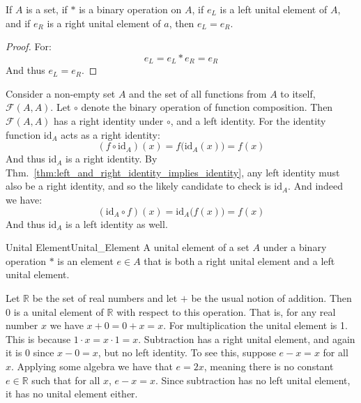     \begin{theorem}
        \label{thm:left_and_right_identity_implies_identity}%
        If $A$ is a set, if $*$ is a binary operation on $A$, if $e_{L}$ is a
        left unital element of $A$, and if $e_{R}$ is a right unital element of
        $a$, then $e_{L}=e_{R}$.
    \end{theorem}
    \begin{proof}
        For:
        \begin{equation}
            e_{L}=e_{L}*e_{R}=e_{R}
        \end{equation}
        And thus $e_{L}=e_{R}$.
    \end{proof}
    \begin{example}
        Consider a non-empty set $A$ and the set of all functions from $A$ to
        itself, $\mathcal{F}(A,A)$. Let $\circ$ denote the binary operation of
        function composition. Then $\mathcal{F}(A,A)$ has a right identity under
        $\circ$, and a left identity. For
        the identity function $\textrm{id}_{A}$ acts as a right identity:
        \begin{equation}
            (f\circ\textrm{id}_{A})(x)
            =f\big(\textrm{id}_{A}(x)\big)
            =f(x)
        \end{equation}
        And thus $\textrm{id}_{A}$ is a right identity. By
        Thm.~\ref{thm:left_and_right_identity_implies_identity}, any left
        identity must also be a right identity, and so the likely candidate to
        check is $\textrm{id}_{A}$. And indeed we have:
        \begin{equation}
            (\textrm{id}_{A}\circ{f})(x)
            =\textrm{id}_{A}\big(f(x)\big)
            =f(x)
        \end{equation}
        And thus $\textrm{id}_{A}$ is a left identity as well.
    \end{example}
    \begin{fdefinition}{Unital Element}{Unital_Element}
        A \gls{unital element} of a \gls{set} $A$ under a \gls{binary operation}
        $*$ is an element $e\in{A}$ that is both a right unital element and a
        left unital element.
    \end{fdefinition}
    \begin{example}
        Let $\mathbb{R}$ be the set of real numbers and let $+$ be the usual
        notion of addition. Then 0 is a unital element of $\mathbb{R}$ with
        respect to this operation. That is, for any real number $x$ we have
        $x+0=0+x=x$. For multiplication the unital element is 1. This is because
        $1\cdot{x}=x\cdot{1}=x$. Subtraction has a right unital element, and
        again it is 0 since $x-0=x$, but no left identity. To see this, suppose
        $e-x=x$ for all $x$. Applying some algebra we have that $e=2x$, meaning
        there is no constant $e\in\mathbb{R}$ such that for all $x$, $e-x=x$.
        Since subtraction has no left unital element, it has no unital element
        either.
    \end{example}
